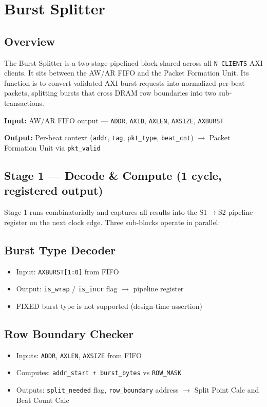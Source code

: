 \section{Burst Splitter}
\subsection{Overview}

The Burst Splitter is a two-stage pipelined block shared across all \texttt{N\_CLIENTS} AXI clients. It sits between the AW/AR FIFO and the Packet Formation Unit. Its function is to convert validated AXI burst requests into normalized per-beat packets, splitting bursts that cross DRAM row boundaries into two sub-transactions.

\medskip
\noindent\textbf{Input:} AW/AR FIFO output --- \texttt{ADDR}, \texttt{AXID}, \texttt{AXLEN}, \texttt{AXSIZE}, \texttt{AXBURST}

\noindent\textbf{Output:} Per-beat context (\texttt{addr}, \texttt{tag}, \texttt{pkt\_type}, \texttt{beat\_cnt}) $\rightarrow$ Packet Formation Unit via \texttt{pkt\_valid}

\subsection{Stage 1 --- Decode \& Compute (1 cycle, registered output)}

Stage 1 runs combinatorially and captures all results into the S1$\rightarrow$S2 pipeline register on the next clock edge. Three sub-blocks operate in parallel:

\subsection{Burst Type Decoder}
\begin{itemize}[noitemsep]
  \item Input: \texttt{AXBURST[1:0]} from FIFO
  \item Output: \texttt{is\_wrap} / \texttt{is\_incr} flag $\rightarrow$ pipeline register
  \item FIXED burst type is not supported (design-time assertion)
\end{itemize}

\subsection{Row Boundary Checker}
\begin{itemize}[noitemsep]
  \item Inputs: \texttt{ADDR}, \texttt{AXLEN}, \texttt{AXSIZE} from FIFO
  \item Computes: \texttt{addr\_start + burst\_bytes} vs \texttt{ROW\_MASK}
  \item Outputs: \texttt{split\_needed} flag, \texttt{row\_boundary} address $\rightarrow$ Split Point Calc and Beat Count Calc
\end{itemize}

